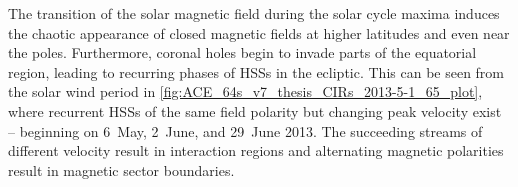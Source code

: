 The transition of the solar magnetic field during the solar cycle maxima induces the chaotic appearance of closed magnetic fields at higher latitudes and even near the poles. Furthermore, coronal holes begin to invade parts of the equatorial region, leading to recurring phases of HSSs in the ecliptic. This can be seen from the solar wind period in \autoref{fig:ACE_64s_v7_thesis_CIRs_2013-5-1_65_plot}, where recurrent HSSs of the same field polarity but changing peak velocity exist -- beginning on 6~May, 2~June, and 29~June 2013. The succeeding streams of different velocity result in interaction regions and alternating magnetic polarities result in magnetic sector boundaries.


